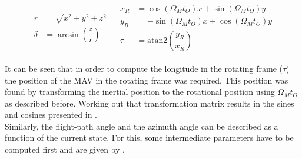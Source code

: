 \begin{align} \label{eq:latAndLong}
\begin{split} 
r&=\sqrt{x^{2}+y^{2}+z^{2}}\\
\delta&=\arcsin\left(\dfrac{z}{r}\right)
\end{split} 
&
\begin{split}
x_{R}&=\cos\left(\Omega_{M}t_{O}\right)x+\sin\left(\Omega_{M}t_{O}\right)y\\
y_{R}&=-\sin\left(\Omega_{M}t_{O}\right)x+\cos\left(\Omega_{M}t_{O}\right)y\\
\tau&=\text{atan2}\left(\dfrac{y_{R}}{x_{R}}\right)
\end{split}
\end{align}
 
It can be seen that in order to compute the longitude in the rotating frame ($\tau$) the position of the \ac{MAV} in the rotating frame was required. This position was found by transforming the inertial position to the rotational position using $\Omega_{M}t_{O}$ as described before. Working out that transformation matrix results in the sines and cosines presented in .\\

Similarly, the flight-path angle and the azimuth angle can be described as a function of the current state. For this, some intermediate parameters have to be computed first and are given by .

